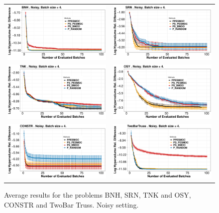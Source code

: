 \begin{figure}[ht]
        \begin{tabular}{cc}
                \includegraphics[width=0.475\linewidth]{Figures/ppesmoc/BNH_noisy.pdf} &
                \includegraphics[width=0.475\linewidth]{Figures/ppesmoc/SRN_noisy.pdf} \\
                \includegraphics[width=0.475\linewidth]{Figures/ppesmoc/TNK_noisy.pdf} &
                \includegraphics[width=0.475\linewidth]{Figures/ppesmoc/OSY_noisy.pdf} \\
                \includegraphics[width=0.475\linewidth]{Figures/ppesmoc/CONSTR_noisy_noisy.pdf} &
                \includegraphics[width=0.475\linewidth]{Figures/ppesmoc/TBT_noisy.pdf} 
        \end{tabular}
        \caption{{Average results for the problems BNH, SRN, TNK and OSY, CONSTR and TwoBar Truss. Noisy setting. }}
        \label{fig:benchmark_1}
\end{figure}


